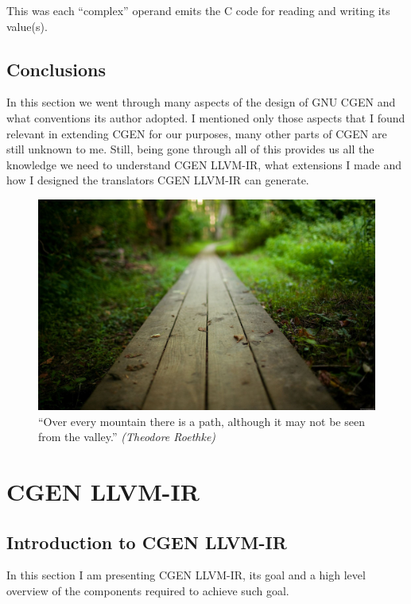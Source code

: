 \documentclass{article}
\begin{document}
This was each ``complex'' operand emits the C code for reading and writing its value(s).

\subsection{Conclusions}
In this section we went through many aspects of the design of GNU CGEN and what conventions its author adopted. I mentioned only those aspects that I found relevant in extending CGEN for our purposes, many other parts of CGEN are still unknown to me. Still, being gone through all of this provides us all the knowledge we need to understand CGEN LLVM-IR, what extensions I made and how I designed the translators CGEN LLVM-IR can generate.
\vfill

\begin{figure}[H]
  \centering
    \includegraphics[width=1.0\textwidth]{path_2}
  \caption{``Over every mountain there is a path, although it may not be seen from the valley.'' \emph{(Theodore Roethke)}}
  \label{fig:gull}
\end{figure}
\clearpage
\section{CGEN LLVM-IR} \label{sec:cgen-llvm-ir}
\subsection{Introduction to CGEN LLVM-IR}
In this section I am presenting CGEN LLVM-IR, its goal and a high level overview of the components required to achieve such goal.
\end{document}
